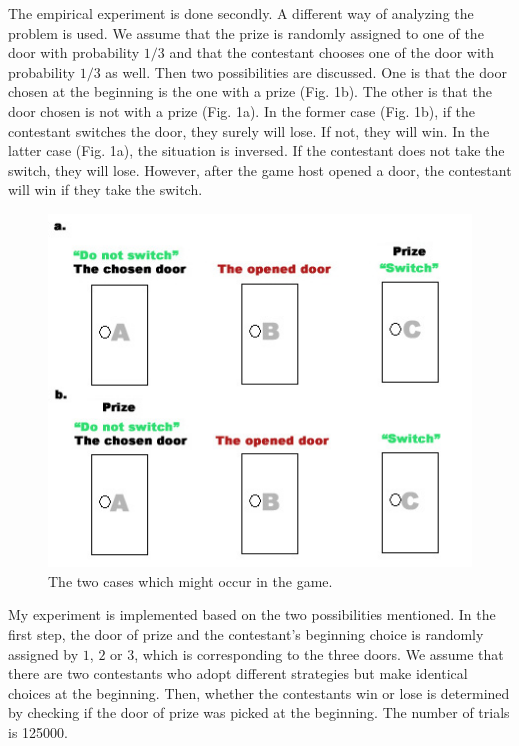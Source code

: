 \documentclass[12pt]{article}
\begin{document}
The empirical experiment is done secondly. A different way of analyzing the problem is used. We assume that the prize is randomly assigned 
to one of the door with probability $1/3$ and that the contestant chooses one of the door with probability $1/3$ as well. Then two possibilities 
are discussed. One is that the door chosen at the beginning is the one with a prize (Fig. 1b). The other is that the door chosen is not 
with a prize (Fig. 1a). In the former case (Fig. 1b), if the contestant switches the door, they surely will lose. If not, they will win. 
In the latter case (Fig. 1a), the situation is inversed. If the contestant does not take the switch, they will lose. However, after the game 
host opened a door, the contestant will win if they take the switch.

\begin{figure}[h]
\centering
\includegraphics{MontyHall.jpg}
\caption{The two cases which might occur in the game.}
\end{figure}

My experiment is implemented based on the two possibilities mentioned. In the first step, the door of prize and the contestant's beginning 
choice is randomly assigned by $1$, $2$ or $3$, which is corresponding to the three doors. We assume that there are two contestants who adopt 
different strategies but make identical choices at the beginning. Then, whether the contestants win or lose is determined by checking if 
the door of prize was picked at the beginning. The number of trials is 125000.
\end{document}

